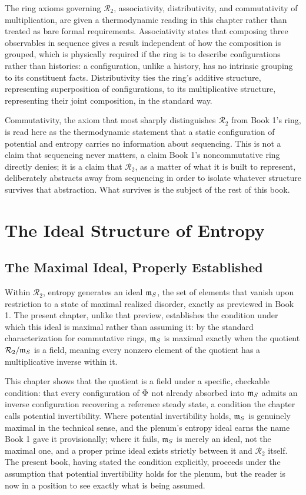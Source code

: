 The ring axioms governing $\mathcal{R}_2$, associativity, distributivity, and commutativity of multiplication, are given a thermodynamic reading in this chapter rather than treated as bare formal requirements. Associativity states that composing three observables in sequence gives a result independent of how the composition is grouped, which is physically required if the ring is to describe configurations rather than histories: a configuration, unlike a history, has no intrinsic grouping to its constituent facts. Distributivity ties the ring's additive structure, representing superposition of configurations, to its multiplicative structure, representing their joint composition, in the standard way.

Commutativity, the axiom that most sharply distinguishes $\mathcal{R}_2$ from Book 1's ring, is read here as the thermodynamic statement that a static configuration of potential and entropy carries no information about sequencing. This is not a claim that sequencing never matters, a claim Book 1's noncommutative ring directly denies; it is a claim that $\mathcal{R}_2$, as a matter of what it is built to represent, deliberately abstracts away from sequencing in order to isolate whatever structure survives that abstraction. What survives is the subject of the rest of this book.

\part{The Ideal Structure of Entropy}

\chapter{The Maximal Ideal, Properly Established}

Within $\mathcal{R}_2$, entropy generates an ideal $\mathfrak{m}_{S}$, the set of elements that vanish upon restriction to a state of maximal realized disorder, exactly as previewed in Book 1. The present chapter, unlike that preview, establishes the condition under which this ideal is maximal rather than assuming it: by the standard characterization for commutative rings, $\mathfrak{m}_{S}$ is maximal exactly when the quotient $\mathcal{R}_2 / \mathfrak{m}_{S}$ is a field, meaning every nonzero element of the quotient has a multiplicative inverse within it.

This chapter shows that the quotient is a field under a specific, checkable condition: that every configuration of $\Phi$ not already absorbed into $\mathfrak{m}_{S}$ admits an inverse configuration recovering a reference steady state, a condition the chapter calls potential invertibility. Where potential invertibility holds, $\mathfrak{m}_{S}$ is genuinely maximal in the technical sense, and the plenum's entropy ideal earns the name Book 1 gave it provisionally; where it fails, $\mathfrak{m}_{S}$ is merely an ideal, not the maximal one, and a proper prime ideal exists strictly between it and $\mathcal{R}_2$ itself. The present book, having stated the condition explicitly, proceeds under the assumption that potential invertibility holds for the plenum, but the reader is now in a position to see exactly what is being assumed.

